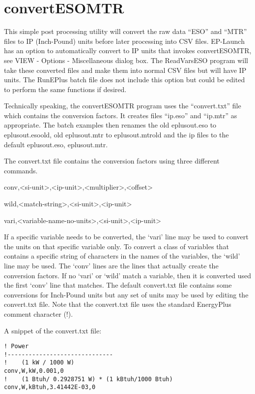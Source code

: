 \chapter{convertESOMTR}\label{convertesomtr}

This simple post processing utility will convert the raw data ``ESO'' and ``MTR'' files to IP (Inch-Pound) units before later processing into CSV files. EP-Launch has an option to automatically convert to IP units that invokes convertESOMTR, see VIEW - Options - Miscellaneous dialog box. The ReadVarsESO program will take these converted files and make them into normal CSV files but will have IP units. The RunEPlus batch file does not include this option but could be edited to perform the same functions if desired.

Technically speaking, the convertESOMTR program uses the ``convert.txt'' file which contains the conversion factors. It creates files ``ip.eso'' and ``ip.mtr'' as appropriate. The batch examples then renames the old eplusout.eso to eplusout.esoold, old eplusout.mtr to eplusout.mtrold and the ip files to the default eplusout.eso, eplusout.mtr.

The convert.txt file contains the conversion factors using three different commands.

conv,\textless{}si-unit\textgreater{},\textless{}ip-unit\textgreater{},\textless{}multiplier\textgreater{},\textless{}offset\textgreater{}

wild,\textless{}match-string\textgreater{},\textless{}si-unit\textgreater{},\textless{}ip-unit\textgreater{}

vari,\textless{}variable-name-no-units\textgreater{},\textless{}si-unit\textgreater{},\textless{}ip-unit\textgreater{}

If a specific variable needs to be converted, the `vari' line may be used to convert the units on that specific variable only. To convert a class of variables that contains a specific string of characters in the names of the variables, the `wild' line may be used. The `conv' lines are the lines that actually create the conversion factors. If no `vari' or `wild' match a variable, then it is converted used the first `conv' line that matches. The default convert.txt file contains some conversions for Inch-Pound units but any set of units may be used by editing the convert.txt file. Note that the convert.txt file uses the standard EnergyPlus comment character (!).

A snippet of the convert.txt file:

\begin{lstlisting}
! Power
!------------------------------
!    (1 kW / 1000 W)
conv,W,kW,0.001,0
!    (1 Btuh/ 0.2928751 W) * (1 kBtuh/1000 Btuh)
conv,W,kBtuh,3.41442E-03,0
\end{lstlisting}
